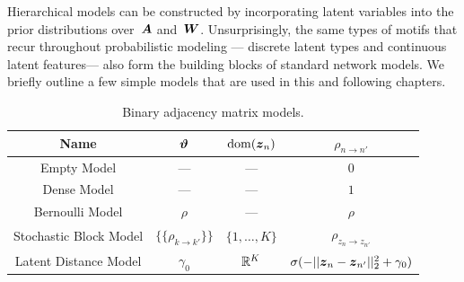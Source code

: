 Hierarchical models can be constructed by incorporating latent
variables into the prior distributions over~$\boldsymbol{A}$ and~$\boldsymbol{W}$.
Unsurprisingly, the same types of motifs that recur throughout
probabilistic modeling --- discrete latent types and continuous
latent features--- also form the building blocks of
standard network models.  We briefly outline a few simple models that
are used in this and following chapters.

\begin{table}
\begin{center}
\begin{tabular}{c|c|c|c}
Name & $\boldsymbol{\vartheta}$ & $\mathrm{dom}(\boldsymbol{z}_n)$ & $\rho_{n \to n'}$ \\
\hline
Empty Model & --- &  --- & $0$ \\
Dense Model & --- & --- & $1$ \\
Bernoulli Model & $\rho$ & --- & $\rho$ \\
Stochastic Block Model & $\{\{\rho_{k \to k'}\}\}$ & $\{1, \ldots, K\}$ & $\rho_{z_n \to z_{n'}}$ \\
Latent Distance Model & $\gamma_0$ & $\mathbb{R}^K$ & $\sigma(-||\boldsymbol{z}_n - \boldsymbol{z}_{n'}||_2^2 + \gamma_0)$
\end{tabular}
\end{center}
\caption{Binary adjacency matrix models.}
\label{tab:A_models}
\end{table}

